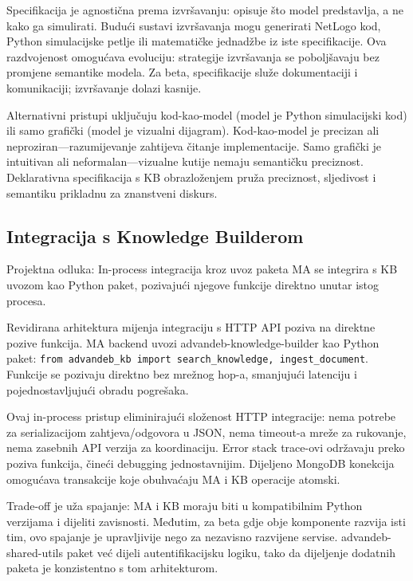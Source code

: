 \documentclass[12pt,a4paper]{article}
\begin{document}
Specifikacija je agnostična prema izvršavanju: opisuje što model predstavlja, a ne kako ga simulirati. Budući sustavi izvršavanja mogu generirati NetLogo kod, Python simulacijske petlje ili matematičke jednadžbe iz iste specifikacije. Ova razdvojenost omogućava evoluciju: strategije izvršavanja se poboljšavaju bez promjene semantike modela. Za beta, specifikacije služe dokumentaciji i komunikaciji; izvršavanje dolazi kasnije.

Alternativni pristupi uključuju kod-kao-model (model je Python simulacijski kod) ili samo grafički (model je vizualni dijagram). Kod-kao-model je precizan ali neproziran—razumijevanje zahtijeva čitanje implementacije. Samo grafički je intuitivan ali neformalan—vizualne kutije nemaju semantičku preciznost. Deklarativna specifikacija s KB obrazloženjem pruža preciznost, sljedivost i semantiku prikladnu za znanstveni diskurs.

\subsection{Integracija s Knowledge Builderom}

\begin{rationale}{Projektna odluka: In-process integracija kroz uvoz paketa}
MA se integrira s KB uvozom kao Python paket, pozivajući njegove funkcije direktno unutar istog procesa.
\end{rationale}

Revidirana arhitektura mijenja integraciju s HTTP API poziva na direktne pozive funkcija. MA backend uvozi advandeb-knowledge-builder kao Python paket: \texttt{from advandeb\_kb import search\_knowledge, ingest\_document}. Funkcije se pozivaju direktno bez mrežnog hop-a, smanjujući latenciju i pojednostavljujući obradu pogrešaka.

Ovaj in-process pristup eliminirajući složenost HTTP integracije: nema potrebe za serializacijom zahtjeva/odgovora u JSON, nema timeout-a mreže za rukovanje, nema zasebnih API verzija za koordinaciju. Error stack trace-ovi održavaju preko poziva funkcija, čineći debugging jednostavnijim. Dijeljeno MongoDB konekcija omogućava transakcije koje obuhvaćaju MA i KB operacije atomski.

Trade-off je uža spajanje: MA i KB moraju biti u kompatibilnim Python verzijama i dijeliti zavisnosti. Međutim, za beta gdje obje komponente razvija isti tim, ovo spajanje je upravljivije nego za nezavisno razvijene servise. advandeb-shared-utils paket već dijeli autentifikacijsku logiku, tako da dijeljenje dodatnih paketa je konzistentno s tom arhitekturom.
\end{document}
